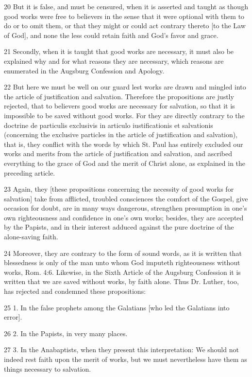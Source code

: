 20 But it is false, and must be censured, when it is asserted and taught as though good works were free to believers in the sense that it were optional with them to do or to omit them, or that they might or could act contrary thereto [to the Law of God], and none the less could retain faith and God’s favor and grace.

21 Secondly, when it is taught that good works are necessary, it must also be explained why and for what reasons they are necessary, which reasons are enumerated in the Augsburg Confession and Apology.

22 But here we must be well on our guard lest works are drawn and mingled into the article of justification and salvation. Therefore the propositions are justly rejected, that to believers good works are necessary for salvation, so that it is impossible to be saved without good works. For they are directly contrary to the doctrine de particulis exclusivis in articulo iustificationis et salvationis (concerning the exclusive particles in the article of justification and salvation), that is, they conflict with the words by which St. Paul has entirely excluded our works and merits from the article of justification and salvation, and ascribed everything to the grace of God and the merit of Christ alone, as explained in the preceding article.

23 Again, they [these propositions concerning the necessity of good works for salvation] take from afflicted, troubled consciences the comfort of the Gospel, give occasion for doubt, are in many ways dangerous, strengthen presumption in one’s own righteousness and confidence in one’s own works; besides, they are accepted by the Papists, and in their interest adduced against the pure doctrine of the alone-saving faith.

24 Moreover, they are contrary to the form of sound words, as it is written that blessedness is only of the man unto whom God imputeth righteousness without works, Rom. 4:6. Likewise, in the Sixth Article of the Augsburg Confession it is written that we are saved without works, by faith alone. Thus Dr. Luther, too, has rejected and condemned these propositions:

25 1. In the false prophets among the Galatians [who led the Galatians into error].

26 2. In the Papists, in very many places.

27 3. In the Anabaptists, when they present this interpretation: We should not indeed rest faith upon the merit of works, but we must nevertheless have them as things necessary to salvation.

